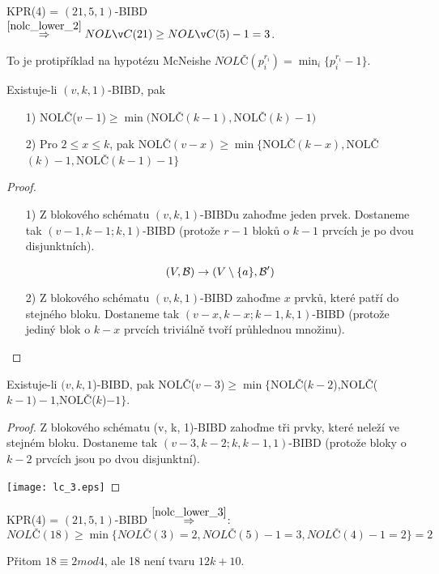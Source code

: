 \begin{example}
	KPR(4) = $(21, 5, 1)$-BIBD $\stackrel{\cref{nolc_lower_2}}{\Rightarrow}NOLČ(21) \geq NOLČ(5) - 1 = 3$.

	To je protipříklad na hypotézu McNeishe $NOLČ(p_i^{r_i}) = \min_i \{ p_i^{r_i} - 1 \}$.
\end{example}

\begin{theorem}
    Existuje-li $(v,k,1)$-BIBD, pak
    \begin{itemize}
        \item[1)] NOLČ($v-1$)$\geq\min($NOLČ$(k-1),$NOLČ$(k)-1)$
        \item[2)] Pro $2\leq x\leq k$, pak NOLČ$(v-x)\geq\min\{$NOLČ$(k-x),$NOLČ$(k)-1,$NOLČ$(k-1)-1\}$
    \end{itemize}
\end{theorem}
\begin{proof}
    \begin{itemize}
        \item[1)]  Z blokového schématu $(v, k, 1)$-BIBDu zahoďme jeden prvek.
		Dostaneme tak $(v-1, k - 1; k, 1)$-BIBD (protože $r - 1$ bloků o $k - 1$ prvcích je po dvou disjunktních).

		\[ (V, \operatorname{\mathcal{B}}) \to (V \setminus \{ a \}, \operatorname{\mathcal{B}}^{\prime}) \]

        \item[2)] Z blokového schématu $(v, k, 1)$-BIBD zahoďme $x$ prvků, které patří do stejného bloku.
		Dostaneme tak $(v - x, k - x; k - 1, k, 1)$-BIBD (protože jediný blok o $k - x$ prvcích triviálně tvoří průhlednou množinu).

    \end{itemize}
\end{proof}

\begin{theorem}\label{nolc_lower_3}
    Existuje-li $(v,k,1$)-BIBD, pak NOLČ($v-3$)$\geq\min\{$NOLČ($k-2$),NOLČ($k-1)-1$,NOLČ($k$)$-1\}$.
\end{theorem}
\begin{proof}
	Z blokového schématu (v, k, 1)-BIBD zahoďme tři prvky, které neleží ve stejném bloku.
	Dostaneme tak $(v - 3, k - 2; k, k - 1, 1)$-BIBD (protože bloky o $k - 2$ prvcích jsou po dvou disjunktní).

	\texttt{[image: lc\_3.eps]}
\end{proof}

\begin{example}
	KPR(4) = $(21, 5, 1)$-BIBD $\stackrel{\cref{nolc_lower_3}}{\Rightarrow}$:
	\[ NOLČ(18) \geq \min \{ NOLČ(3) = 2, NOLČ(5) - 1 = 3, NOLČ(4) - 1 = 2 \} = 2 \]

	Přitom $18 \equiv 2 mod 4$, ale 18 není tvaru $12k + 10$.
\end{example}

